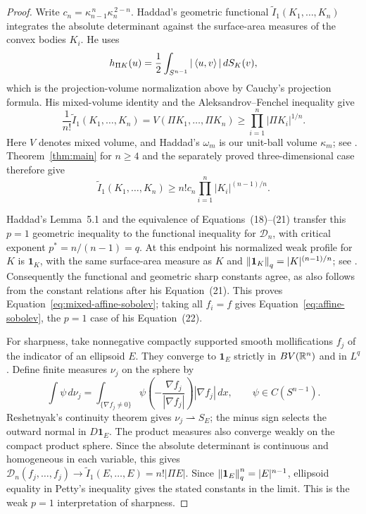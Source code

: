 \begin{proof}
Write $c_n=\kappa_{n-1}^{\,n}\kappa_n^{\,2-n}$.
Haddad's geometric functional
$\widetilde I_1(K_1,\ldots,K_n)$ integrates the absolute determinant
against the surface-area measures of the convex bodies $K_i$.
He uses
\[
 h_{\Pi K}(u)=\frac12\int_{S^{n-1}}|\left\langle u,v\right\rangle|\,dS_K(v),
\]
which is the projection-volume normalization above by Cauchy's
projection formula. His mixed-volume identity and the
Aleksandrov--Fenchel inequality give
\[
 \frac1{n!}\widetilde I_1(K_1,\ldots,K_n)
 =V(\Pi K_1,\ldots,\Pi K_n)
 \ge\prod_{i=1}^n|\Pi K_i|^{1/n}.
\]
Here $V$ denotes mixed volume, and Haddad's $\omega_m$ is our
unit-ball volume $\kappa_m$; see
\cite[arXiv version, Introduction, p.~5]{Haddad2020}.
Theorem~\ref{thm:main} for $n\ge4$ and the separately proved
three-dimensional case \cite[Theorem~1.1]{ChenEtAl2026} therefore give
\[
 \widetilde I_1(K_1,\ldots,K_n)
 \ge n!c_n\prod_{i=1}^n|K_i|^{(n-1)/n}.
\]

Haddad's Lemma~5.1 and the equivalence of Equations~(18)--(21)
\cite[arXiv version, Section~5, pp.~16--17]{Haddad2020}
transfer this $p=1$ geometric inequality to the functional inequality
for $\mathcal D_n$, with critical exponent $p^*=n/(n-1)=q$.
At this endpoint his normalized weak profile for $K$ is $\mathbf1_K$,
with the same surface-area measure as
$K$ and $\left\lVert\mathbf1_K\right\rVert_q=|K|^{(n-1)/n}$; see
\cite[arXiv version, Equation~(9) and Definition~2.2, pp.~8--9]{Haddad2020}.
Consequently the functional and geometric sharp constants agree, as
also follows from the constant relations after his Equation~(21).
This proves Equation~\eqref{eq:mixed-affine-sobolev}; taking all
$f_i=f$ gives Equation~\eqref{eq:affine-sobolev}, the $p=1$ case of
his Equation~(22).

For sharpness, take nonnegative compactly supported smooth
mollifications $f_j$ of the indicator of an ellipsoid $E$. They converge to
$\mathbf1_E$ strictly in $BV(\mathbb R^n)$ and in $L^q$. Define finite measures
$\nu_j$ on the sphere by
\[
 \int\psi\,d\nu_j
 =\int_{\{\nabla f_j\ne0\}}
   \psi\!\left(-\frac{\nabla f_j}{|\nabla f_j|}\right)
   |\nabla f_j|\,dx,
 \qquad \psi\in C(S^{n-1}).
\]
Reshetnyak's continuity theorem
\cite[author version, Theorem~1.3, p.~3]{Spector2011} gives
$\nu_j\rightharpoonup S_E$; the minus sign selects the outward normal
in $D\mathbf1_E$. The product measures also converge weakly on the
compact product sphere. Since the absolute determinant is continuous
and homogeneous in each variable, this gives
$\mathcal D_n(f_j,\ldots,f_j)\to
\widetilde I_1(E,\ldots,E)=n!|\Pi E|$. Since
$\left\lVert\mathbf1_E\right\rVert_q^n=|E|^{n-1}$, ellipsoid equality in Petty's
inequality gives the stated constants in the limit. This is the weak
$p=1$ interpretation of sharpness.
\end{proof}

